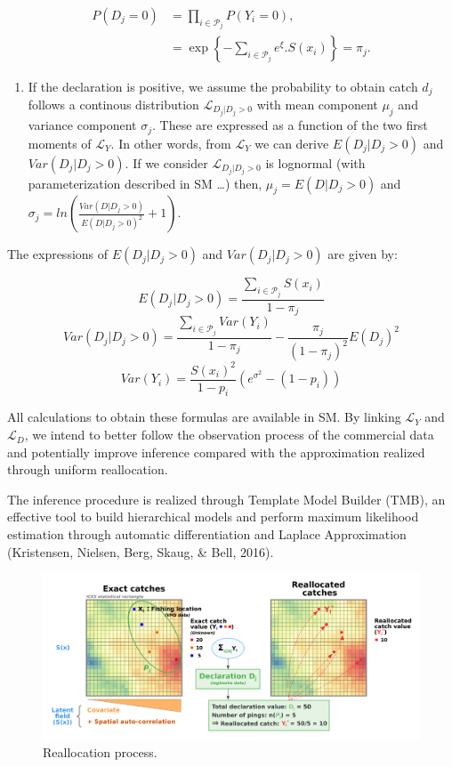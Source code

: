 \documentclass[
  english,
  man]{apa6}
\providecommand{\tightlist}{%
  \setlength{\itemsep}{0pt}\setlength{\parskip}{0pt}}
\begin{document}
\begin{align*}
P(D_j = 0) & = \prod_{i\in \mathcal{P}_j} P(Y_{i} = 0),\nonumber \\
                      & = \exp{ \left \lbrace- \sum_{i\in \mathcal{P}_j} e^{\xi}. S(x_{i})\right \rbrace} = \pi_j.
\end{align*}

\begin{enumerate}
\def\labelenumi{(\arabic{enumi})}
\setcounter{enumi}{1}
\tightlist
\item
  If the declaration is positive, we assume the probability to obtain catch \(d_j\) follows a continous distribution \(\mathcal{L}_{D_j|D_j>0}\) with mean component \(\mu_j\) and variance component \(\sigma_j\). These are expressed as a function of the two first moments of \(\mathcal{L}_Y\). In other words, from \(\mathcal{L}_Y\) we can derive \(E(D_j \vert D_j > 0)\) and \(Var(D_j \vert D_j > 0)\). If we consider \(\mathcal{L}_{D_j|D_j>0}\) is lognormal (with parameterization described in SM \ldots) then, \(\mu_j = E(D|D_j>0)\) and \(\sigma_j = ln(\frac{Var(D|D_j>0)}{E(D|D_j>0)^2} + 1)\).
\end{enumerate}

The expressions of \(E(D_j \vert D_j > 0)\) and \(Var(D_j \vert D_j > 0)\) are given by:

\[E(D_j \vert D_j > 0)=\frac{\sum_{i \in \mathcal{P}_j} S(x_{i})}{1-\pi_j}\]
\[Var(D_j \vert D_j > 0) = \frac{\sum_{i \in \mathcal{P}_j} Var(Y_{i})}{1-\pi_j} - \frac{\pi_j}{(1-\pi_j)^2}E(D_j)^2\]
\[Var(Y_{i})=\frac{S(x_{i})^2}{1-p_{i}}(e^{\sigma^2}-(1-p_{i}))\]

All calculations to obtain these formulas are available in SM. By linking \(\mathcal{L}_Y\) and \(\mathcal{L}_D\), we intend to better follow the observation process of the commercial data and potentially improve inference compared with the approximation realized through uniform reallocation.

The inference procedure is realized through Template Model Builder (TMB), an effective tool to build hierarchical models and perform maximum likelihood estimation through automatic differentiation and Laplace Approximation (Kristensen, Nielsen, Berg, Skaug, \& Bell, 2016).

\begin{figure}
\centering
\includegraphics{images/realloc.png}
\caption{\label{fig:ParBiasSingle} Reallocation process.}
\end{figure}
\end{document}
